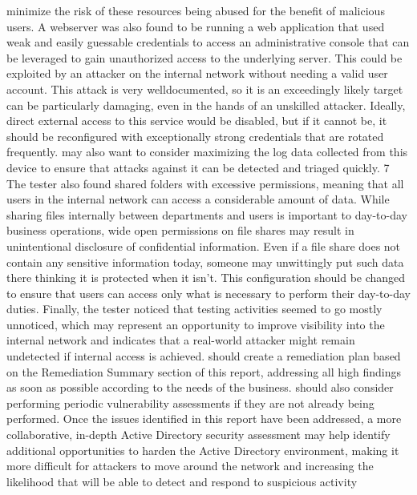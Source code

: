 minimize the risk of these resources being abused for the benefit of malicious users.
A webserver was also found to be running a web application that used weak and easily guessable credentials to access an
administrative console that can be leveraged to gain unauthorized access to the underlying server. This could be
exploited by an attacker on the internal network without needing a valid user account. This attack is very welldocumented, so it is an exceedingly likely target can be particularly damaging, even in the hands of an unskilled attacker.
Ideally, direct external access to this service would be disabled, but if it cannot be, it should be reconfigured with
exceptionally strong credentials that are rotated frequently. \enterpriseName may also want to consider maximizing the log
data collected from this device to ensure that attacks against it can be detected and triaged quickly.
7
The tester also found shared folders with excessive permissions, meaning that all users in the internal network can access
a considerable amount of data. While sharing files internally between departments and users is important to day-to-day
business operations, wide open permissions on file shares may result in unintentional disclosure of confidential
information. Even if a file share does not contain any sensitive information today, someone may unwittingly put such
data there thinking it is protected when it isn’t. This configuration should be changed to ensure that users can access only
what is necessary to perform their day-to-day duties.
Finally, the tester noticed that testing activities seemed to go mostly unnoticed, which may represent an opportunity to
improve visibility into the internal network and indicates that a real-world attacker might remain undetected if internal
access is achieved. \enterpriseName should create a remediation plan based on the Remediation Summary section of this
report, addressing all high findings as soon as possible according to the needs of the business. \enterpriseName should also
consider performing periodic vulnerability assessments if they are not already being performed. Once the issues
identified in this report have been addressed, a more collaborative, in-depth Active Directory security assessment may
help identify additional opportunities to harden the Active Directory environment, making it more difficult for attackers
to move around the network and increasing the likelihood that \enterpriseName will be able to detect and respond to
suspicious activity